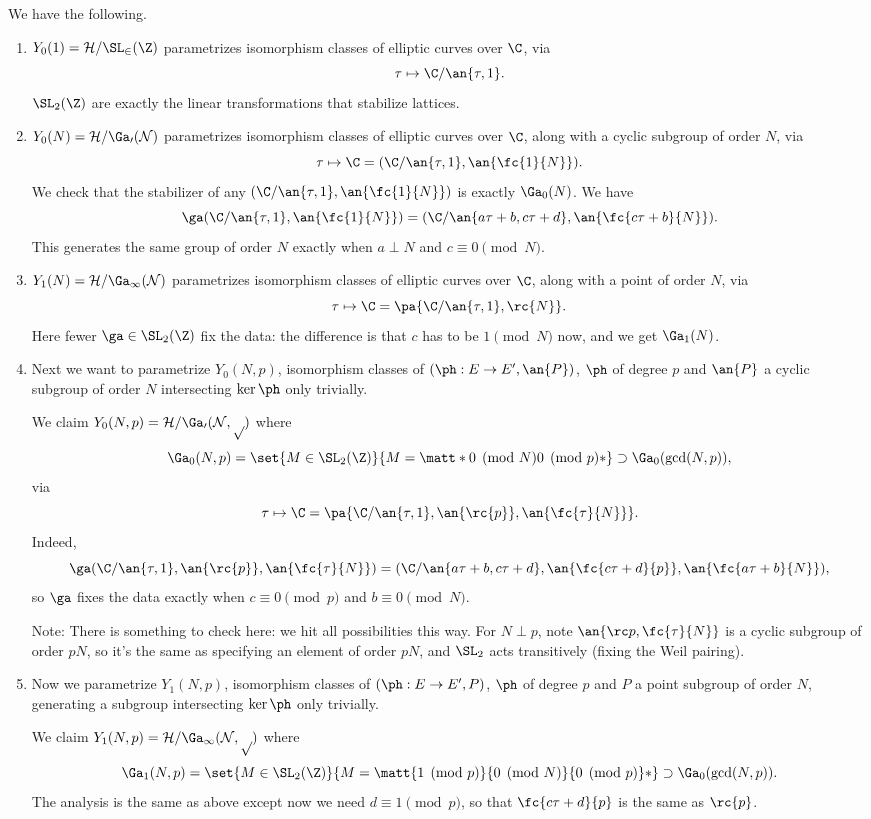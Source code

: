 We have the following. 
\begin{enumerate}
\item $Y_0(1) = \cal H/\SL_2(\Z)$ parametrizes isomorphism classes of elliptic curves over $\C$, via
\[
\tau \mapsto \C/\an{\tau,1}.
\]
$\SL_2(\Z)$ are exactly the linear transformations that stabilize lattices.
\item $Y_0(N) = \cal H/\Ga_0(N)$ parametrizes isomorphism classes of elliptic curves over $\C$, along with a cyclic subgroup of order $N$, via
\[
\tau \mapsto \C=(\C/\an{\tau,1},\an{\fc{1}{N}}).
\]
We check that the stabilizer of any $(\C/\an{\tau,1},\an{\fc{1}{N}})$ is exactly $\Ga_0(N)$. We have
\[
\ga(\C/\an{\tau,1},\an{\fc{1}{N}})=
(\C/\an{a\tau +b,c\tau +d},\an{\fc{c\tau +b}{N}}).
\]
This generates the same group of order $N$ exactly when $a\perp N$ and $c\equiv 0 \pmod N$.
\item $Y_1(N) = \cal H/\Ga_1(N)$ parametrizes isomorphism classes of elliptic curves over $\C$, along with a point of order $N$, via
\[
\tau \mapsto \C=\pa{\C/\an{\tau,1},\rc{N}}.
\]
Here fewer $\ga\in \SL_2(\Z)$ fix the data: the difference is that $c$ has to be $1\pmod N$ now, and we get $\Ga_1(N)$.
\item Next we want to parametrize $Y_0(N,p)$, isomorphism classes of $(\ph:E\to E',\an{P})$, $\ph$ of degree $p$ and $\an{P}$ a cyclic subgroup of order $N$ intersecting $\ker\ph$ only trivially.

We claim $Y_0(N,p)=\cal H/\Ga_0(N,p)$ where \[\Ga_0(N,p)=\set{M\in \SL_2(\Z)}{M= \matt *{0\pmod N}{0\pmod p}*}\supset \Ga_0(\gcd(N,p)),\]
via
\[
\tau \mapsto \C=\pa{\C/\an{\tau,1},\an{\rc{p}},\an{\fc{\tau}{N}}}.
\]
Indeed, 
\[
\ga(\C/\an{\tau,1},\an{\rc{p}},\an{\fc{\tau}{N}})=(\C/\an{a\tau+b,c\tau+d},\an{\fc{c\tau+d}{p}},
\an{\fc{a\tau+b}{N}}),
\]
so $\ga$ fixes the data exactly when $c\equiv 0\pmod p$ and $b\equiv 0\pmod N$.

{Note:
\hypertarget{e-s/Y0}{} There is something to check here: we hit all possibilities this way. For $N\perp p$, note $\an{\rc p,\fc{\tau}{N}}$ is a cyclic subgroup of order $pN$, so it's the same as specifying an element of order $pN$, and $\SL_2$ acts transitively (fixing the Weil pairing). } 
\item Now we parametrize $Y_1(N,p)$, isomorphism classes of $(\ph:E\to E',P)$, $\ph$ of degree $p$ and $P$ a point subgroup of order $N$, generating a subgroup intersecting $\ker\ph$ only trivially.

We claim $Y_1(N,p)=\cal H/\Ga_1(N,p)$ where \[\Ga_1(N,p)=\set{M\in \SL_2(\Z)}{M= \matt {1\pmod p}{0\pmod N}{0\pmod p}*}\supset \Ga_0(\gcd(N,p)).\]
The analysis is the same as above except now we need $d\equiv 1\pmod p$, so that $\fc{c\tau+d}{p}$ is the same as $\rc{p}$.
\end{enumerate}
